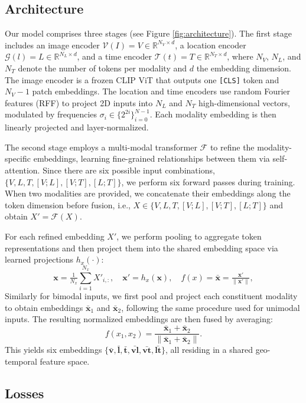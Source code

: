 \subsection{Architecture}

Our model comprises three stages (see  Figure \ref{fig:architecture}). The first stage includes an image encoder $\mathcal{V}(I)=V\!\in\!\mathbb{R}^{N_V\times d}$, a location encoder $\mathcal{G}(l)=L\!\in\!\mathbb{R}^{N_L\times d}$, and a time encoder $\mathcal{T}(t)=T\!\in\!\mathbb{R}^{N_T\times d}$, where $N_V$, $N_L$, and $N_T$ denote the number of tokens per modality and $d$ the embedding dimension. The image encoder is a frozen CLIP ViT \cite{clip} that outputs one \texttt{[CLS]} token and $N_V\!-\!1$ patch embeddings. The location and time encoders use random Fourier features (RFF) to project 2D inputs into $N_L$ and $N_T$ high-dimensional vectors, modulated by frequencies $\sigma_i\!\in\!\{2^{2i}\}_{i=0}^{N-1}$. Each modality embedding is then linearly projected and layer-normalized.

The second stage employs a multi-modal transformer $\mathcal{F}$ to refine the modality-specific embeddings, learning fine-grained relationships between them via self-attention. Since there are six possible input combinations, $\{V,L,T,[V;L], [V;T], [L;T]\}$, we perform six forward passes during training. When two modalities are provided, we concatenate their embeddings along the token dimension before fusion, i.e., $X\!\in\!\{V,L,T,[V;L],[V;T],[L;T]\}$ and obtain $X'=\mathcal{F}(X)$.

For each refined embedding $X'$, we perform pooling to aggregate token representations and then project them into the shared embedding space via learned projections $h_x(\cdot)$:
\[
\mathbf{x}=\tfrac{1}{N_x}\sum_{i=1}^{N_x}X'_{i,:},\quad 
\mathbf{x}'=h_x(\mathbf{x}),\quad 
f(x)=\bar{\mathbf{x}}=\tfrac{\mathbf{x}'}{\|\mathbf{x}'\|},
\]
Similarly for bimodal inputs, we first pool and project each constituent modality to obtain embeddings $\bar{\mathbf{x}}_1$ and $\bar{\mathbf{x}}_2$, 
following the same procedure used for unimodal inputs. The resulting normalized embeddings are then fused by averaging: 
\[
f(x_1, x_2) = 
\frac{\bar{\mathbf{x}}_1 + \bar{\mathbf{x}}_2}{
\|\bar{\mathbf{x}}_1 + \bar{\mathbf{x}}_2\|}.
\]
This yields six embeddings $\{\bar{\mathbf{v}}, \bar{\mathbf{l}}, \bar{\mathbf{t}}, \bar{\mathbf{vl}}, \bar{\mathbf{vt}}, \bar{\mathbf{lt}}\}$, all residing in a shared geo-temporal feature space.

\subsection{Losses}

